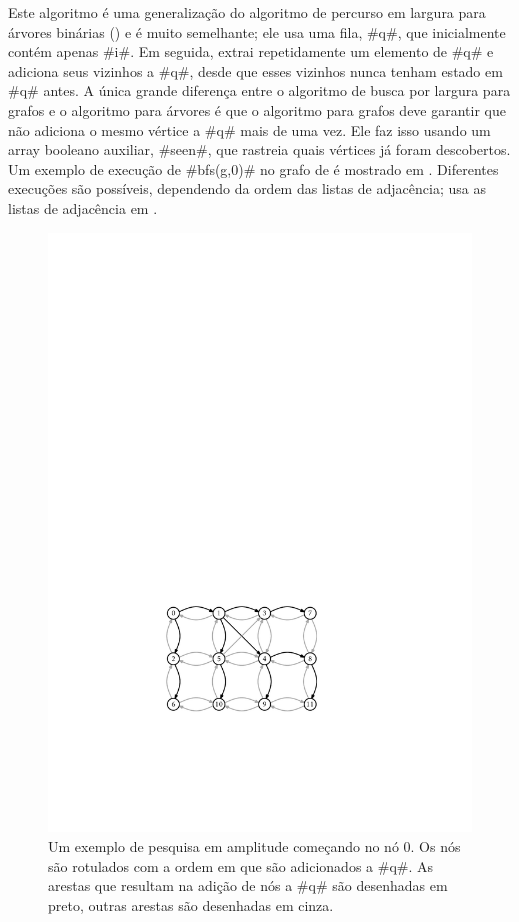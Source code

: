 Este algoritmo é uma generalização do algoritmo de percurso em largura para árvores binárias () e é muito semelhante; ele usa uma fila, #q#, que inicialmente contém apenas #i#. Em seguida, extrai repetidamente um elemento de #q# e adiciona seus vizinhos a #q#, desde que esses vizinhos nunca tenham estado em #q# antes. A única grande diferença entre o algoritmo de busca por largura para grafos e o algoritmo para árvores é que o algoritmo para grafos deve garantir que não adiciona o mesmo vértice a #q# mais de uma vez. Ele faz isso usando um array booleano auxiliar, #seen#, que rastreia quais vértices já foram descobertos.
Um exemplo de execução de #bfs(g,0)# no grafo de  é mostrado em . Diferentes execuções são possíveis, dependendo da ordem das listas de adjacência;  usa as listas de adjacência em .

\begin{figure}
	\begin{center}
		\includegraphics[scale=0.90909]{figs/graph-bfs}
	\end{center}
	\caption[busca em Largura]{Um exemplo de pesquisa em amplitude começando no nó 0. Os nós são rotulados com a ordem em que são adicionados a #q#. As arestas que resultam na adição de nós a #q# são desenhadas em preto, outras arestas são desenhadas em cinza.}
\end{figure}

